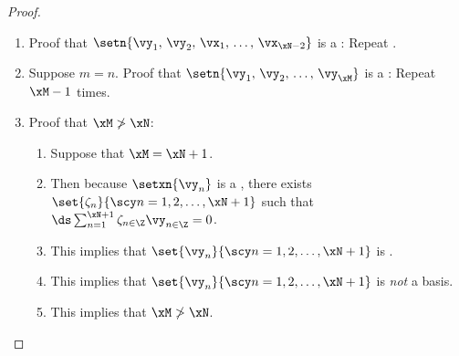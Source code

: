 \begin{proof}
\begin{enumerate}
\begin{enumerate}
      \item Proof that $\setn{\vy_1,\,\vx_1,\,\ldots,\,\vx_{\xN-1}}$ is :
        \begin{enumerate}
          \item If $\setn{\vy_1,\,\vx_1,\,\ldots,\,\vx_{\xN-1}}$ is , then there exists 
                   $\setn{\epsilon,\,\epsilon_1,\,\ldots,\,\epsilon_{\xN-1}}$ such that 
            \\$\ds\epsilon\vy_1 + \brp{\sum_{n=1}^{\xN-1}\epsilon_{n\in\Z} \vx_n} + 0\vx_{n} = 0$.  \label{item:frm_MN_epsilon}
          \item {} implies that the coordinate of $\vy_1$ associated with $\vx_n$ \emph{is} $0$.
            \\$\ds\vy_1 = -\brp{\sum_{n=1}^{\xN-1}\frac{\epsilon_n}{\epsilon} \vx_n} + 0\vx_{n} = 0$.  \label{item:frm_MN_epsilon1}
          \item {} implies that the coordinate of $\vy_1$ associated with $\vx_n$ is \emph{not} $0$.
            \\$\ds \vy_1 = -\sum_{n=1}^\xN \frac{\alpha_n}{\beta}\vx_n$.  \label{item:frm_MN_epsilon2}
          \item This implies that  (that the set is linearly dependent) is \emph{false}
                because  and  \emph{contradict} each other.
          \item This implies $\setn{\vy_1,\,\vx_1,\,\ldots,\,\vx_{\xN-1}}$ is .
        \end{enumerate}

    \end{enumerate}

  \item Proof that $\setn{\vy_1,\,\vy_2,\,\vx_1,\,\ldots,\,\vx_{\xN-2}}$ is a : Repeat .

  \item Suppose $m=n$. Proof that $\setn{\vy_1,\,\vy_2,\,\ldots,\,\vy_\xM}$ is a : 
        Repeat  $\xM-1$ times.
        \label{item:frm_MN_xM}

  \item Proof that $\xM\ngtr\xN$: \label{item:frm_MN_ngtr}
    \begin{enumerate}
      \item Suppose that $\xM=\xN+1$. 
      \item Then because $\setxn{\vy_n}$ is a , there exists $\set{\zeta_n}{\scy n=1,2,\ldots,\xN+1}$ such that 
        \\$\ds \sum_{n=1}^{\xN+1} \zeta_{n\in\Z} \vy_{n\in\Z} = 0$.
      \item This implies that $\set{\vy_n}{\scy n=1,2,\ldots,\xN+1}$ is .
      \item This implies that $\set{\vy_n}{\scy n=1,2,\ldots,\xN+1}$ is \emph{not} a basis.
      \item This implies that $\xM\ngtr\xN$.
    \end{enumerate}


\end{enumerate}
\end{proof}
